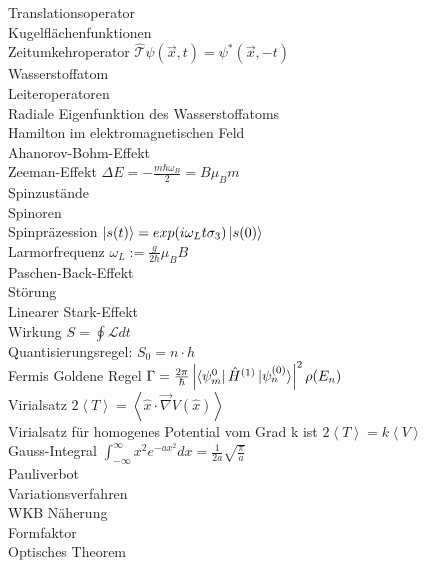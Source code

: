 \documentclass{article}
\begin{document}
Translationsoperator \\

Kugelfl\"achenfunktionen \\

Zeitumkehroperator $\hat{\mathcal{T}}\psi(\vec{x}, t) = \psi^*(\vec{x}, -t)$\\

Wasserstoffatom \\

Leiteroperatoren \\

Radiale Eigenfunktion des Wasserstoffatoms \\

Hamilton im elektromagnetischen Feld \\

Ahanorov-Bohm-Effekt \\

Zeeman-Effekt $\Delta E = - \frac{m \hbar \omega_B}{2} = B \mu_B m$ \\

Spinzust\"ande \\

Spinoren \\

Spinpr\"azession $\ket{s(t)} = exp(i \omega_L t \sigma_3) \ket{s(0)} $ \\

Larmorfrequenz $\omega_L := \frac{g}{2 \hbar} \mu_B B$ \\

Paschen-Back-Effekt \\

St\"orung \\

Linearer Stark-Effekt \\

Wirkung $S = \oint \mathcal{L} dt $ \\

Quantisierungsregel: $S_0 = n \cdot h$ \\

Fermis Goldene Regel $\Gamma = \frac{2\pi}{\hbar} \left| \bra{\psi_m^{0}} \hat{H}^{(1)} \ket{\psi_n^{(0)}} \right|^2 \rho(E_n) $\\

Virialsatz $2 \left< T \right> = \left< \hat{x} \cdot \vec{\nabla}V(\hat{x}) \right> $ \\

Virialsatz f\"ur homogenes Potential vom Grad k ist $2 \left< T \right> = k \left< V \right> $ \\

Gauss-Integral $ \int_{-\infty}^{\infty}x^2e^{-ax^2} dx = \frac{1}{2a} \sqrt{\frac{\pi}{a}}$ \\

Pauliverbot \\

Variationsverfahren \\

WKB N\"aherung \\

Formfaktor \\

Optisches Theorem \\
\end{document}
